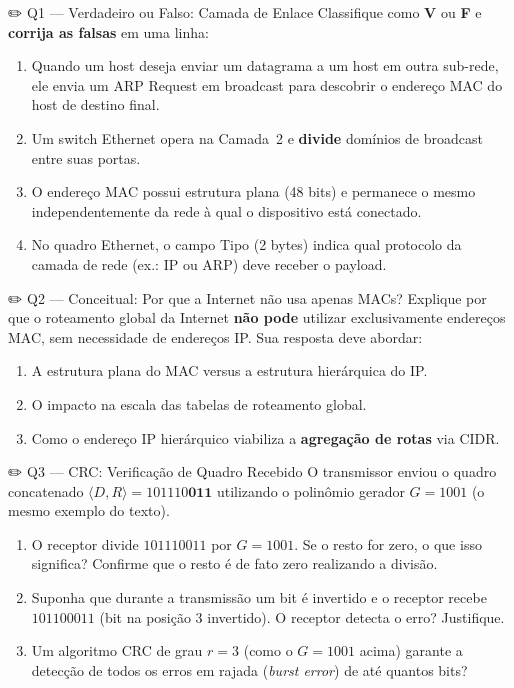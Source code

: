 \documentclass[11pt,a4paper]{article}
\begin{document}
\begin{questao}{✏️ Q1 --- Verdadeiro ou Falso: Camada de Enlace}
Classifique como \textbf{V} ou \textbf{F} e \textbf{corrija as falsas} em uma linha:
\begin{enumerate}[label=(\alph*)]
    \item Quando um host deseja enviar um datagrama a um host em outra sub-rede, ele envia um ARP Request em broadcast para descobrir o endereço MAC do host de destino final.
    \item Um switch Ethernet opera na Camada~2 e \textbf{divide} domínios de broadcast entre suas portas.
    \item O endereço MAC possui estrutura plana (48 bits) e permanece o mesmo independentemente da rede à qual o dispositivo está conectado.
    \item No quadro Ethernet, o campo Tipo (2 bytes) indica qual protocolo da camada de rede (ex.: IP ou ARP) deve receber o payload.
\end{enumerate}
\end{questao}

\begin{questao}{✏️ Q2 --- Conceitual: Por que a Internet não usa apenas MACs?}
Explique por que o roteamento global da Internet \textbf{não pode} utilizar exclusivamente endereços MAC, sem necessidade de endereços IP. Sua resposta deve abordar:
\begin{enumerate}[label=(\alph*)]
    \item A estrutura plana do MAC versus a estrutura hierárquica do IP.
    \item O impacto na escala das tabelas de roteamento global.
    \item Como o endereço IP hierárquico viabiliza a \textbf{agregação de rotas} via CIDR.
\end{enumerate}
\end{questao}

\begin{questao}{✏️ Q3 --- CRC: Verificação de Quadro Recebido}
O transmissor enviou o quadro concatenado $\langle D, R \rangle = 101110\mathbf{011}$ utilizando o polinômio gerador $G = 1001$ (o mesmo exemplo do texto).
\begin{enumerate}[label=(\alph*)]
    \item O receptor divide $101110011$ por $G = 1001$. Se o resto for zero, o que isso significa? Confirme que o resto é de fato zero realizando a divisão.
    \item Suponha que durante a transmissão um bit é invertido e o receptor recebe $101100011$ (bit na posição 3 invertido). O receptor detecta o erro? Justifique.
    \item Um algoritmo CRC de grau $r=3$ (como o $G=1001$ acima) garante a detecção de todos os erros em rajada (\textit{burst error}) de até quantos bits?
\end{enumerate}
\end{questao}
\end{document}
